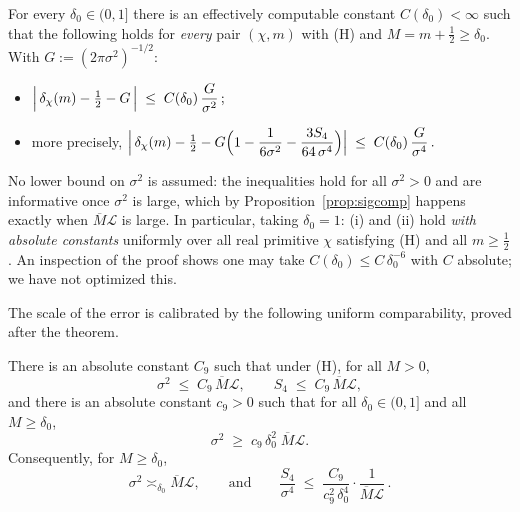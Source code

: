 \begin{theorem}\label{thm:joint}
For every $\delta_0\in(0,1]$ there is an effectively computable
constant $C(\delta_0)<\infty$ such that the following holds for
\emph{every} pair $(\chi,m)$ with (H) and $M=m+\tfrac12\ge\delta_0$.
With $G:=(2\pi\sigma^2)^{-1/2}$:
\begin{itemize}
\item[(i)]
$\displaystyle
\Bigl|\,\delta_\chi(m)-\tfrac12-G\,\Bigr|
\;\le\;C(\delta_0)\,\frac{G}{\sigma^{2}}\,;
$
\item[(ii)] more precisely,
$\displaystyle
\Bigl|\,\delta_\chi(m)-\tfrac12
-G\Bigl(1-\frac{1}{6\sigma^{2}}-\frac{3S_4}{64\,\sigma^{4}}\Bigr)
\Bigr|
\;\le\;C(\delta_0)\,\frac{G}{\sigma^{4}}\,.
$
\end{itemize}
No lower bound on $\sigma^2$ is assumed: the inequalities hold for all
$\sigma^2>0$ and are informative once $\sigma^2$ is large, which by
Proposition~\ref{prop:sigcomp} happens exactly when
$\overline M\mathcal L$ is large. In particular, taking $\delta_0=1$:
(i) and (ii) hold \emph{with absolute constants} uniformly over all
real primitive $\chi$ satisfying (H) and all $m\ge\tfrac12$. An
inspection of the proof shows one may take
$C(\delta_0)\le C\,\delta_0^{-6}$ with $C$ absolute; we have not
optimized this.
\end{theorem}

The scale of the error is calibrated by the following uniform
comparability, proved after the theorem.

\begin{proposition}
\label{prop:sigcomp}
There is an absolute constant $C_9$ such that under (H), for all
$M>0$,
\begin{equation}\label{eq:sigup}
\sigma^{2}\;\le\;C_9\,\overline M\mathcal L,
\qquad
S_4\;\le\;C_9\,\overline M\mathcal L ,
\end{equation}
and there is an absolute constant $c_9>0$ such that for all
$\delta_0\in(0,1]$ and all $M\ge\delta_0$,
\begin{equation}\label{eq:siglow}
\sigma^{2}\;\ge\;c_9\,\delta_0^{2}\;\overline M\mathcal L .
\end{equation}
Consequently, for $M\ge\delta_0$,
\begin{equation}\label{eq:lindeberg}
\sigma^2\asymp_{\delta_0}\overline M\mathcal L,
\qquad\text{and}\qquad
\frac{S_4}{\sigma^{4}}
\;\le\;\frac{C_9}{c_9^{2}\,\delta_0^{4}}\cdot
\frac{1}{\overline M\mathcal L}\,.
\end{equation}
\end{proposition}

